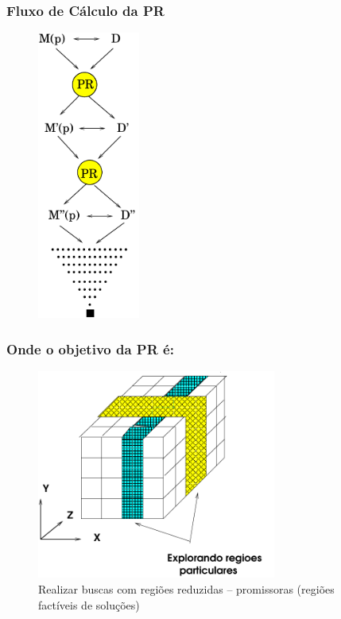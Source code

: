 \begin{frame}[fragile]

\frametitle{Fluxo de Cálculo da PR}

\begin{figure}[!htb]
\centering
\includegraphics[width=0.30\textwidth, height=0.75\textheight]{figures/dinamica_pr.pdf}
\end{figure}
   
\end{frame}



\begin{frame}[fragile]

\frametitle{Onde o objetivo da PR é:}

\begin{figure}[!htb]
\begin{center}
\includegraphics[width=0.70\textwidth, height=0.60\textheight]{figures/reducao_PR_01.pdf}
\caption{Realizar buscas com regiões reduzidas -- promissoras (regiões factíveis de soluções)}
\end{center}
\end{figure}
    
\end{frame}





